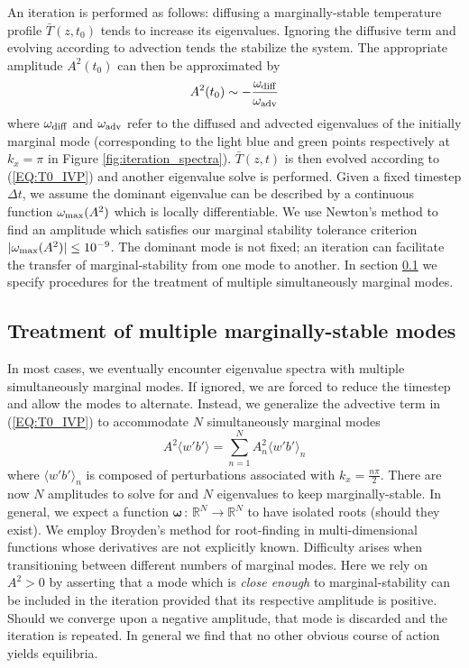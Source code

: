 \documentclass[reprint,amsmath,amssymb,aps]{revtex4-1}
\begin{document}
An iteration is performed as follows: diffusing a marginally-stable temperature profile $\bar{T}(z, t_0)$ tends to increase its eigenvalues. 
Ignoring the diffusive term and evolving according to advection tends the stabilize the system. The appropriate amplitude $A^2(t_0)$ can then be approximated by
\begin{equation}
    A^2(t_0) \sim -\frac{\omega_{\rm{diff}}}{\omega_{\rm{adv}}}
\end{equation}
where $\omega_{\rm{diff}}$ and $\omega_{\rm{adv}}$ refer to the diffused and advected eigenvalues of the initially marginal mode (corresponding to the light blue and green points respectively at $k_x = \pi$ in Figure \ref{fig:iteration_spectra}). 
$\bar{T}(z, t)$ is then evolved according to (\ref{EQ:T0_IVP}) and another eigenvalue solve is performed. 
Given a fixed timestep $\Delta t$, we assume the dominant eigenvalue can be described by a continuous function $\omega_{\rm{max}} (A^2)$ which is locally differentiable. 
We use Newton's method to find an amplitude which satisfies our marginal stability tolerance criterion $|\omega_{\rm{max}} (A^2)| \leq 10^{-9}$. 
The dominant mode is not fixed; an iteration can facilitate the transfer of marginal-stability from one mode to another. 
In section \ref{sec:multiple_modes} we specify procedures for the treatment of multiple simultaneously marginal modes.

\subsection{Treatment of multiple marginally-stable modes} \label{sec:multiple_modes}
In most cases, we eventually encounter eigenvalue spectra with multiple simultaneously marginal modes. If ignored, we are forced to reduce the timestep and allow the modes to alternate. Instead, we generalize the advective term in (\ref{EQ:T0_IVP}) to accommodate $N$ simultaneously marginal modes
\begin{equation}
    A^2 \langle w' b' \rangle = \sum_{n = 1}^{N} A^2_{n} \langle w' b' \rangle_{n}
\end{equation}
where  $\langle w' b' \rangle_{n}$ is composed of perturbations associated with $k_x = \frac{n\pi}{2}$. 
There are now $N$ amplitudes to solve for and $N$ eigenvalues to keep marginally-stable. 
In general, we expect a function $\mathbf{\omega} \, : \, \mathbb{R}^N \to  \mathbb{R}^N$ to have isolated roots (should they exist). 
We employ Broyden's method for root-finding in multi-dimensional functions whose derivatives are not explicitly known. 
Difficulty arises when transitioning between different numbers of marginal modes. 
Here we rely on $A^2 > 0$ by asserting that a mode which is \textit{close enough} to marginal-stability can be included in the iteration provided that its respective amplitude is positive. 
Should we converge upon a negative amplitude, that mode is discarded and the iteration is repeated. 
In general we find that no other obvious course of action yields equilibria.
\end{document}
